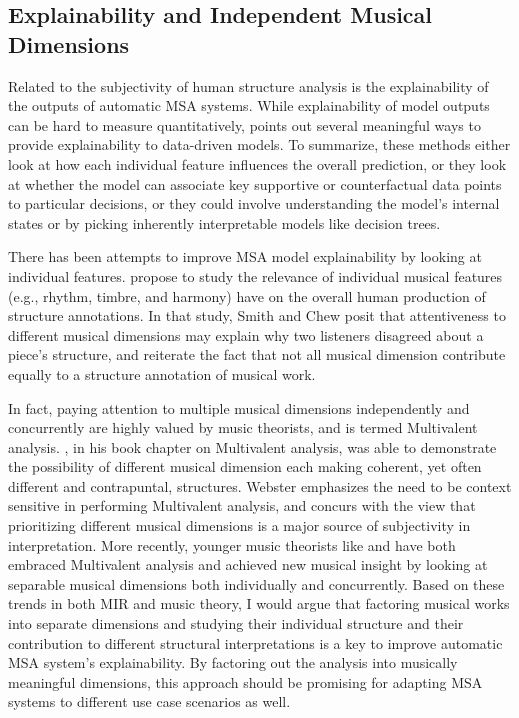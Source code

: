\subsection{Explainability and Independent Musical Dimensions}
Related to the subjectivity of human structure analysis is the explainability of the outputs of automatic MSA systems.
While explainability of model outputs can be hard to measure quantitatively, \cite{molnar2019} points out several meaningful ways to provide explainability to data-driven models.
To summarize, these methods either look at how each individual feature influences the overall prediction, or they look at whether the model can associate key supportive or counterfactual data points to particular decisions, or they could involve understanding the model's internal states or by picking inherently interpretable models like decision trees.

There has been attempts to improve MSA model explainability by looking at individual features.
\cite{smith2013quadratic} propose to study the relevance of individual musical features (e.g., rhythm, timbre, and harmony) have on the overall human production of structure annotations.
In that study, Smith and Chew posit that attentiveness to different musical dimensions may explain why two listeners disagreed about a piece's structure, and reiterate the fact that not all musical dimension contribute equally to a structure annotation of musical work.

In fact, paying attention to multiple musical dimensions independently and concurrently are highly valued by music theorists, and is termed Multivalent analysis.
\cite{webster2009multivalent}, in his book chapter on Multivalent analysis, was able to demonstrate the possibility of different musical dimension each making coherent, yet often different and contrapuntal, structures.
Webster emphasizes the need to be context sensitive in performing Multivalent analysis, and concurs with the view that prioritizing different musical dimensions is a major source of subjectivity in interpretation.
More recently, younger music theorists like \cite{brody2016parametric} and \cite{yust2018organized} have both embraced Multivalent analysis and achieved new musical insight by looking at separable musical dimensions both individually and concurrently.
Based on these trends in both MIR and music theory, I would argue that factoring musical works into separate dimensions and studying their individual structure and their contribution to different structural interpretations is a key to improve automatic MSA system's explainability.
By factoring out the analysis into musically meaningful dimensions, this approach should be promising for adapting MSA systems to different use case scenarios as well.

